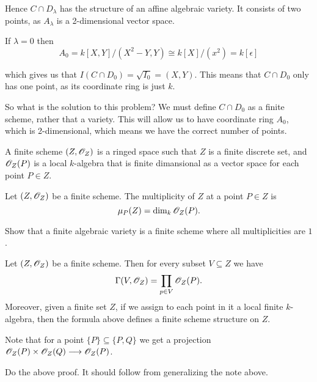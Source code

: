 
Hence $C\cap D_\lambda$ has the structure of an affine algebraic variety. It consists of two points, as $A_\lambda$ is a 2-dimensional vector space. 

If $\lambda = 0$ then 
\begin{equation*}
    A_0 = k[X, Y]/(X^2-Y, Y)\cong k[X]/(x^2) = k[\epsilon]
\end{equation*}

which gives us that $I(C\cap D_0)=\sqrt{I_0}=(X, Y)$. This means that $C\cap D_0$ only has one point, as its coordinate ring is just $k$. 

So what is the solution to this problem? We must define $C\cap D_0$ as a finite scheme, rather that a variety. This will allow us to have coordinate ring $A_0$, which is 2-dimensional, which means we have the correct number of points. 

\begin{definition}
A finite scheme $(Z, \mathscr{O}_Z)$ is a ringed space such that $Z$ is a finite discrete set, and $\mathscr{O}_Z(P)$ is a local $k$-algebra that is finite dimansional as a vector space for each point $P\in Z$.
\end{definition}

\begin{definition}
Let $(Z, \mathscr{O}_Z)$ be a finite scheme. The multiplicity of $Z$ at a point $P\in Z$ is 
\begin{equation*}
    \mu_P(Z)=\dim_k\mathscr{O}_Z(P).
\end{equation*}
\end{definition}

\begin{problem}
Show that a finite algebraic variety is a finite scheme where all multiplicities are $1$. 
\end{problem}

\begin{proposition}
Let $(Z,\mathscr{O}_Z)$ be a finite scheme. Then for every subset $V\subseteq Z$ we have 
\begin{equation*}
    \Gamma(V, \mathscr{O}_Z)=\prod_{p\in V}\mathscr{O}_Z(P).
\end{equation*}
Moreover, given a finite set $Z$, if we assign to each point in it a local finite $k$-algebra, then the formula above defines a finite scheme structure on $Z$.
\end{proposition}
Note that for a point $\{P\}\subseteq \{P, Q\}$ we get a projection $\mathscr{O}_Z(P)\times\mathscr{O}_Z(Q)\longrightarrow \mathscr{O}_Z(P)$. 
\begin{problem}
Do the above proof. It should follow from generalizing the note above. 
\end{problem}

